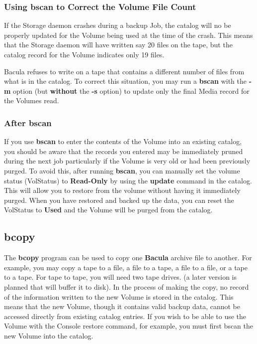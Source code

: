 \subsubsection*{Using bscan to Correct the Volume File Count}

If the Storage daemon crashes during a backup Job, the catalog will no be
properly updated for the Volume being used at the time of the crash. This
means that the Storage daemon will have written say 20 files on the tape, but
the catalog record for the Volume indicates only 19 files. 

Bacula refuses to write on a tape that contains a different number of files
from what is in the catalog. To correct this situation, you may run a {\bf
bscan} with the {\bf -m} option (but {\bf without} the {\bf -s} option) to
update only the final Media record for the Volumes read. 

\subsubsection*{After bscan}

If you use {\bf bscan} to enter the contents of the Volume into an existing
catalog, you should be aware that the records you entered may be immediately
pruned during the next job particularly if the Volume is very old or had been
previously purged. To avoid this, after running {\bf bscan}, you can manually
set the volume status (VolStatus) to {\bf Read-Only} by using the {\bf update}
command in the catalog. This will allow you to restore from the volume without
having it immediately purged. When you have restored and backed up the data,
you can reset the VolStatus to {\bf Used} and the Volume will be purged from
the catalog. 

\subsection*{bcopy}
\label{bcopy}

The {\bf bcopy} program can be used to copy one {\bf Bacula} archive file to
another. For example, you may copy a tape to a file, a file to a tape, a file
to a file, or a tape to a tape. For tape to tape, you will need two tape
drives. (a later version is planned that will buffer it to disk). In the
process of making the copy, no record of the information written to the new
Volume is stored in the catalog. This means that the new Volume, though it
contains valid backup data, cannot be accessed directly from existing catalog
entries. If you wish to be able to use the Volume with the Console restore
command, for example, you must first bscan the new Volume into the catalog. 

